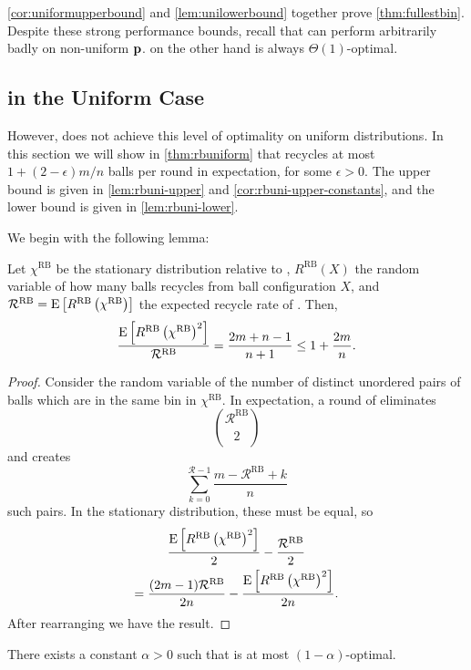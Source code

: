 \cref{cor:uniformupperbound} and \cref{lem:unilowerbound}
together prove \cref{thm:fullestbin}. Despite these strong
performance bounds, recall that \FB can perform arbitrarily badly on
non-uniform $\mathbf{p}$. \RB on the other hand is always $\Theta(1)$-optimal.

\subsection{\RB in the Uniform Case}

However, \RB{} does not achieve this level of optimality on uniform
distributions. In this section we will show in \cref{thm:rbuniform} that \RB
recycles at most $1+(2-\epsilon)m/n$ balls per round in expectation, for some
$\epsilon > 0$.  The upper bound is given in \cref{lem:rbuni-upper} and
\cref{cor:rbuni-upper-constants}, and the lower bound is given in
\cref{lem:rbuni-lower}.

We begin with the following lemma:

\begin{lemma}\label{lem:pair-flow}
	Let $\chi^\textrm{RB}$ be the stationary distribution relative to \RB,
	$R^\textrm{RB}(X)$ the random variable of how many balls \RB recycles from
	ball configuration $X$, and $\mathcal{R}^\textrm{RB} =
	\mathrm{E}\left[R^\textrm{RB}\left(\chi^\textrm{RB}\right)\right]$ the expected recycle rate
	of \RB. Then,
	\[ \frac{\mathrm{E}\left[R^\textrm{RB}\left(\chi^\textrm{RB}\right)^2\right]}{\mathcal{R}^\textrm{RB}} = \frac{2m+n-1}{n+1} \leq 1 + \frac{2m}{n}. \]
\end{lemma}

\begin{proof}
	Consider the random variable of the number of distinct unordered pairs of
	balls which are in the same bin in $\chi^\textrm{RB}$. In expectation, a
	round of \RB eliminates 
	\[\binom{\mathcal{R}^\textrm{RB}}{2}\]
	and creates
	\[\sum_{k=0}^{\mathcal{R} - 1} \frac{m - \mathcal{R}^\textrm{RB} + k}{n}\]
	such pairs. In the stationary distribution, these must be equal, so
	\begin{multline*}
		\frac{\mathrm{E}\left[R^\textrm{RB}\left(\chi^\textrm{RB}\right)^2\right]}{2} - \frac{\mathcal{R}^\textrm{RB}}{2} \\
		= \frac{(2m-1)\mathcal{R}^\textrm{RB}}{2n} - \frac{\mathrm{E}\left[R^\textrm{RB}\left(\chi^\textrm{RB}\right)^2\right]}{2n}.
	\end{multline*}
	After rearranging we have the result.
\end{proof}

\begin{lemma}\label{lem:rbuni-upper}
	There exists a constant $\alpha > 0$ such that \RB is at most
	$(1-\alpha)$-optimal.
\end{lemma}

